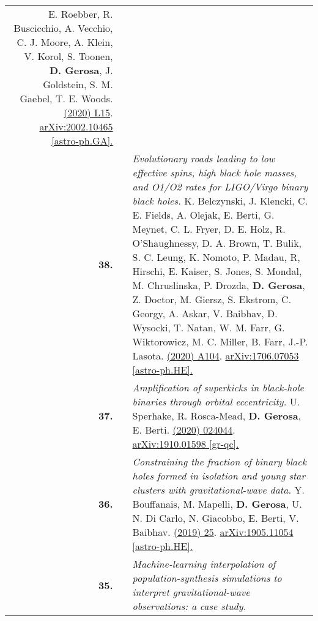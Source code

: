 {\begin{longtable}{rp{0.3cm}p{15.8cm}}
E. Roebber, R. Buscicchio, A. Vecchio, C. J. Moore, A. Klein, V. Korol, S. Toonen, \textbf{D. Gerosa}, J. Goldstein, S. M. Gaebel, T. E. Woods.
\newline{}
\href{https://iopscience.iop.org/article/10.3847/2041-8213/ab8ac9}{\apjl 894 (2020) L15}. \href{https://arxiv.org/abs/2002.10465}{arXiv:2002.10465 [astro-ph.GA].}
\vspace{0.09cm}\\
%
\textbf{38.} & & \textit{Evolutionary roads leading to low effective spins, high black hole masses, and O1/O2 rates for LIGO/Virgo binary black holes.}
\newline{}
K. Belczynski, J. Klencki, C. E. Fields, A. Olejak, E. Berti, G. Meynet, C. L. Fryer, D. E. Holz, R. O'Shaughnessy, D. A. Brown, T. Bulik, S. C. Leung,  K. Nomoto, P. Madau, R, Hirschi, E. Kaiser, S. Jones, S. Mondal, M. Chruslinska, P. Drozda, \textbf{D. Gerosa}, Z. Doctor, M. Giersz, S. Ekstr\:om, C. Georgy, A. Askar, V. Baibhav, D. Wysocki, T. Natan, W. M. Farr, G. Wiktorowicz, M. C. Miller, B. Farr, J.-P. Lasota.
\newline{}
\href{https://www.aanda.org/articles/aa/full_html/2020/04/aa36528-19/aa36528-19.html}{\aap 636 (2020) A104}. \href{https://arxiv.org/abs/1706.07053}{arXiv:1706.07053 [astro-ph.HE].}
\vspace{0.09cm}\\
%
\textbf{37.} & & \textit{Amplification of superkicks in black-hole binaries through orbital eccentricity.}
\newline{}
U. Sperhake, R. Rosca-Mead, \textbf{D. Gerosa}, E. Berti.
\newline{}
\href{https://journals.aps.org/prd/abstract/10.1103/PhysRevD.101.024044}{\prd 101 (2020) 024044}. \href{https://arxiv.org/abs/1910.01598}{arXiv:1910.01598 [gr-qc].}
\vspace{0.09cm}\\
%
\textbf{36.} & & \textit{Constraining the fraction of binary black holes formed in isolation and young star clusters with gravitational-wave data.}
\newline{}
Y. Bouffanais, M. Mapelli, \textbf{D. Gerosa}, U. N. Di Carlo, N. Giacobbo, E. Berti, V. Baibhav.
\newline{}
\href{https://iopscience.iop.org/article/10.3847/1538-4357/ab4a79}{\apj 886 (2019) 25}. \href{https://arxiv.org/abs/1905.11054}{arXiv:1905.11054 [astro-ph.HE].}
\vspace{0.09cm}\\
%
\textbf{35.} & & \textit{Machine-learning interpolation of population-synthesis simulations to interpret gravitational-wave observations: a case study.}

\end{longtable}}
